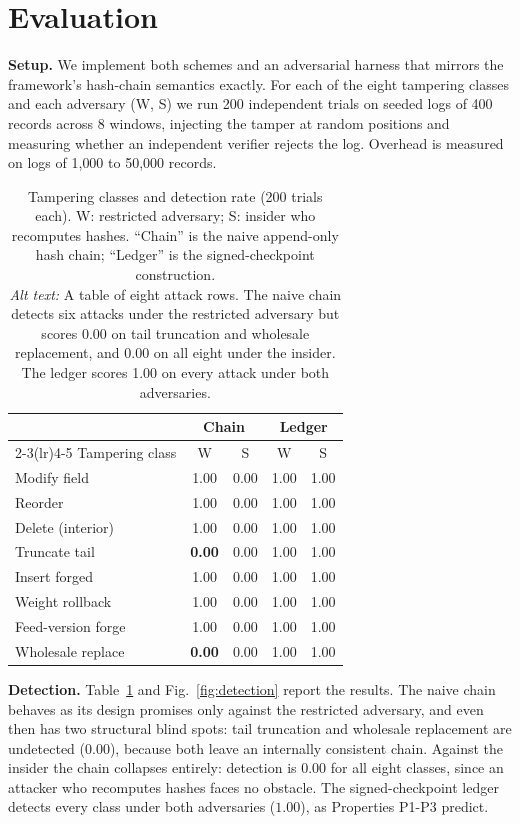 \documentclass[journal]{IEEEtran}
\begin{document}
\section{Evaluation}
\label{sec:eval}
\textbf{Setup.} We implement both schemes and an adversarial harness that
mirrors the framework's hash-chain semantics exactly. For each of the eight
tampering classes and each adversary (W, S) we run 200 independent trials on
seeded logs of 400 records across 8 windows, injecting the tamper at random
positions and measuring whether an independent verifier rejects the log.
Overhead is measured on logs of 1{,}000 to 50{,}000 records.

\begin{table}[!t]
\caption{Tampering classes and detection rate (200 trials each). W: restricted
adversary; S: insider who recomputes hashes. ``Chain'' is the naive
append-only hash chain; ``Ledger'' is the signed-checkpoint construction.\\[2pt]
\textit{Alt text:} A table of eight attack rows. The naive chain detects six
attacks under the restricted adversary but scores 0.00 on tail truncation and
wholesale replacement, and 0.00 on all eight under the insider. The ledger
scores 1.00 on every attack under both adversaries.}
\label{tab:attacks}
\centering
\footnotesize
\begin{tabular}{@{}lcccc@{}}
\toprule
& \multicolumn{2}{c}{Chain} & \multicolumn{2}{c}{Ledger} \\
\cmidrule(lr){2-3}\cmidrule(lr){4-5}
Tampering class & W & S & W & S \\
\midrule
Modify field        & 1.00 & 0.00 & 1.00 & 1.00 \\
Reorder             & 1.00 & 0.00 & 1.00 & 1.00 \\
Delete (interior)   & 1.00 & 0.00 & 1.00 & 1.00 \\
Truncate tail       & \textbf{0.00} & 0.00 & 1.00 & 1.00 \\
Insert forged       & 1.00 & 0.00 & 1.00 & 1.00 \\
Weight rollback     & 1.00 & 0.00 & 1.00 & 1.00 \\
Feed-version forge  & 1.00 & 0.00 & 1.00 & 1.00 \\
Wholesale replace   & \textbf{0.00} & 0.00 & 1.00 & 1.00 \\
\bottomrule
\end{tabular}
\end{table}

\textbf{Detection.} Table~\ref{tab:attacks} and Fig.~\ref{fig:detection}
report the results. The naive chain behaves as its design promises only
against the restricted adversary, and even then has two structural blind
spots: tail truncation and wholesale replacement are undetected
($0.00$), because both leave an internally consistent chain. Against the
insider the chain collapses entirely: detection is $0.00$ for all eight
classes, since an attacker who recomputes hashes faces no obstacle. The
signed-checkpoint ledger detects every class under both adversaries
($1.00$), as Properties P1-P3 predict.
\end{document}
